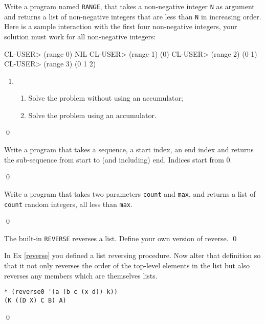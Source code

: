 \documentclass[a4paper,11pt]{article}
\begin{document}
\begin{uexercise}[*]
Write a program named \Verb+RANGE+, that takes a non-negative integer
\Verb+N+ as argument and returns a list of non-negative integers that
are less than \Verb+N+ in increasing order.  Here is a sample
interaction with the first four non-negative integers, your solution
must work for all non-negative integers: 

\begin{lispcode}
CL-USER> (range 0)
NIL
CL-USER> (range 1)
(0)
CL-USER> (range 2)
(0 1)
CL-USER> (range 3)
(0 1 2)
\end{lispcode}

\begin{enumerate}
\item[]
	\begin{enumerate}
	\item Solve the problem without using an accumulator;
	\item Solve the problem using an accumulator.
	\end{enumerate}
\end{enumerate}
\qed
\end{uexercise}

\begin{uexercise}[*]
\label{exsubsecindex}
Write a program that takes a sequence, a start index, an end index
and returns the sub-sequence from start to (and including) end.
Indices start from 0.

\qed
\end{uexercise}

\begin{uexercise}[*]
Write a program that takes two parameters \Verb+count+ and \Verb+max+,
and returns a list of \Verb+count+ random integers, all less than
\Verb+max+.

\qed
\end{uexercise}

\begin{uexercise}
\label{reverse}
The built-in \Verb+REVERSE+ reverses a list. Define your own version of reverse.
\qed
\end{uexercise}

\begin{uexercise}

In Ex \ref{reverse} you defined a list reversing procedure. Now alter that definition so that it  not only reverses the order of the top-level elements in the list but also reverses any members which are themselves lists.

{\small
\begin{Verbatim}
* (reverse0 '(a (b c (x d)) k))
(K ((D X) C B) A)
\end{Verbatim}
}
\qed
\end{uexercise}
\end{document}
